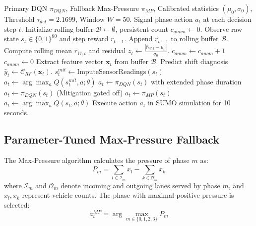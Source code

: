 \documentclass{ieeeaccess}
\begin{document}
\begin{algorithm}[!t]
\caption{Resilient Closed-Loop Traffic Signal Controller}
\label{alg:closed_loop}
\begin{algorithmic}[1]
\REQUIRE Primary DQN $\pi_{DQN}$, Fallback Max-Pressure $\pi_{MP}$, Calibrated statistics $(\mu_0, \sigma_0)$, Threshold $\tau_{det}=2.1699$, Window $W=50$.
\ENSURE Signal phase action $a_t$ at each decision step $t$.
\STATE Initialize rolling buffer $\mathcal{B} \leftarrow \emptyset$, persistent count $c_{anom} \leftarrow 0$.
    \STATE Observe raw state $s_t \in \{0, 1\}^{80}$ and step reward $r_{t-1}$.
    \STATE Append $r_{t-1}$ to rolling buffer $\mathcal{B}$.
        \STATE Compute rolling mean $\bar{r}_{W, t}$ and residual $z_t \leftarrow \frac{|\bar{r}_{W, t} - \mu_0|}{\sigma_0}$.
            \STATE $c_{anom} \leftarrow c_{anom} + 1$
        \ELSE
            \STATE $c_{anom} \leftarrow 0$
        \ENDIF
    \ENDIF
        \STATE Extract feature vector $\mathbf{x}_t$ from buffer $\mathcal{B}$.
        \STATE Predict shift diagnosis $\hat{y}_t \leftarrow \mathcal{C}_{RF}(\mathbf{x}_t)$.
            \STATE $s_t^{mit} \leftarrow \text{ImputeSensorReadings}(s_t)$
            \STATE $a_t \leftarrow \arg\max_{a} Q(s_t^{mit}, a; \theta)$
            \STATE $a_t \leftarrow \pi_{DQN}(s_t)$ with extended phase duration
            \STATE $a_t \leftarrow \pi_{DQN}(s_t)$ (Mitigation gated off)
        \ELSE
            \STATE $a_t \leftarrow \pi_{MP}(s_t)$ 
        \ENDIF
    \ELSE
        \STATE $a_t \leftarrow \arg\max_{a} Q(s_t, a; \theta)$ 
    \ENDIF
    \STATE Execute action $a_t$ in SUMO simulation for 10 seconds.
\ENDFOR
\end{algorithmic}
\end{algorithm}

\subsection{Parameter-Tuned Max-Pressure Fallback}
The Max-Pressure algorithm \cite{varaiya2013max} calculates the pressure of phase $m$ as:
\begin{equation}
P_m = \sum_{l \in \mathcal{I}_m} x_l - \sum_{k \in \mathcal{O}_m} x_k
\label{eq:max_pressure}
\end{equation}
where $\mathcal{I}_m$ and $\mathcal{O}_m$ denote incoming and outgoing lanes served by phase $m$, and $x_l, x_k$ represent vehicle counts. The phase with maximal positive pressure is selected:
\begin{equation}
a_t^{MP} = \arg\max_{m \in \{0, 1, 2, 3\}} P_m
\end{equation}
\end{document}
